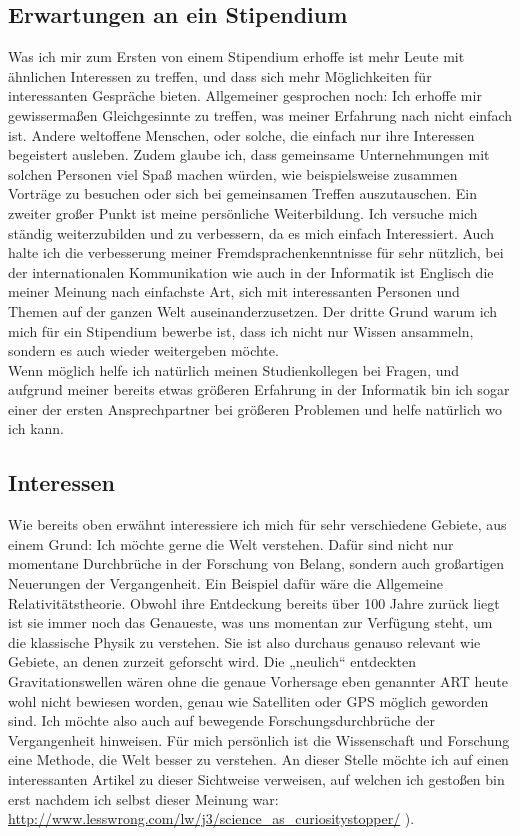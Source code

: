 \documentclass{scrartcl}
\begin{document}
\subsection*{Erwartungen an ein Stipendium}
Was ich mir zum Ersten von einem Stipendium erhoffe ist mehr Leute mit ähnlichen Interessen zu
treffen, und dass sich mehr Möglichkeiten für interessanten Gespräche bieten. Allgemeiner
gesprochen noch: Ich erhoffe mir gewissermaßen Gleichgesinnte zu treffen, was meiner Erfahrung
nach nicht einfach ist. Andere weltoffene Menschen, oder solche, die einfach nur ihre Interessen
begeistert ausleben. Zudem glaube ich, dass gemeinsame Unternehmungen mit solchen Personen viel
Spaß machen würden, wie beispielsweise zusammen Vorträge zu besuchen oder sich bei gemeinsamen
Treffen auszutauschen. Ein zweiter großer Punkt ist meine persönliche Weiterbildung. Ich versuche
mich ständig weiterzubilden und zu verbessern, da es mich einfach Interessiert.
Auch halte ich die verbesserung meiner Fremdsprachenkenntnisse für sehr nützlich,
bei der internationalen Kommunikation wie auch in der Informatik ist Englisch die meiner Meinung
nach einfachste Art, sich mit interessanten Personen und Themen auf der ganzen Welt auseinanderzusetzen.
Der dritte Grund warum ich mich für ein Stipendium bewerbe ist, dass ich nicht nur Wissen
ansammeln, sondern es auch wieder weitergeben möchte. \\ Wenn möglich helfe ich natürlich meinen
Studienkollegen bei Fragen, und aufgrund meiner bereits etwas größeren Erfahrung in der Informatik
bin ich sogar einer der ersten Ansprechpartner bei größeren Problemen und helfe natürlich wo ich kann.

\subsection*{Interessen}
Wie bereits oben erwähnt interessiere ich mich für sehr verschiedene Gebiete, aus einem Grund:
Ich möchte gerne die Welt verstehen. Dafür sind nicht nur momentane Durchbrüche in der Forschung
von Belang, sondern auch großartigen Neuerungen der Vergangenheit. Ein Beispiel dafür wäre die
Allgemeine Relativitätstheorie. Obwohl ihre Entdeckung bereits über 100 Jahre zurück liegt ist
sie immer noch das Genaueste, was uns momentan zur Verfügung steht, um die klassische Physik
zu verstehen. Sie ist also durchaus genauso relevant wie Gebiete, an denen zurzeit geforscht
wird. Die „neulich“ entdeckten Gravitationswellen wären ohne die genaue Vorhersage eben genannter
ART heute wohl nicht bewiesen worden, genau wie Satelliten oder GPS möglich geworden sind.
Ich möchte also auch auf bewegende Forschungsdurchbrüche der Vergangenheit hinweisen. Für mich
persönlich ist die Wissenschaft und Forschung eine Methode, die Welt besser zu verstehen.
An dieser Stelle möchte ich auf einen interessanten Artikel zu dieser Sichtweise
verweisen, auf welchen ich gestoßen bin erst nachdem ich selbst dieser Meinung war:
\url{http://www.lesswrong.com/lw/j3/science\_as\_curiositystopper/}
).
\end{document}
